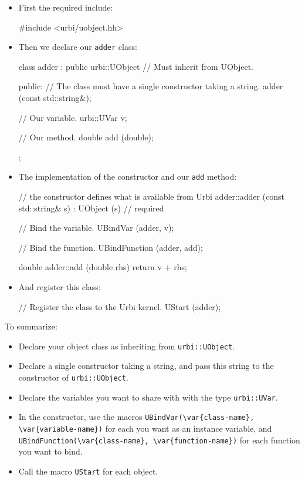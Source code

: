 \begin{itemize}
\item First the required include:

\begin{cxx}
#include <urbi/uobject.hh>
\end{cxx}

\item Then we declare our \lstinline{adder} class:
\begin{cxx}
class adder : public urbi::UObject // Must inherit from UObject.
{
  public:
   // The class must have a single constructor taking a string.
   adder (const std::string&);

   // Our variable.
   urbi::UVar v;

   // Our method.
   double add (double);
};
\end{cxx}
\item The implementation of the constructor and our \lstinline{add}
  method:
\begin{cxx}
// the constructor defines what is available from Urbi
adder::adder (const std::string& s)
  : UObject (s) // required
{
  // Bind the variable.
  UBindVar (adder, v);

  // Bind the function.
  UBindFunction (adder, add);
}

double
adder::add (double rhs)
{
  return v + rhs;
}
\end{cxx}
\item And register this class:
\begin{cxx}
// Register the class to the Urbi kernel.
UStart (adder);
\end{cxx}
\end{itemize}

To summarize:

\begin{itemize}
\item Declare your object class as inheriting from
  \lstinline{urbi::UObject}.
\item Declare a single constructor taking a string, and pass this
  string to the constructor of \lstinline{urbi::UObject}.
\item Declare the variables you want to share with \urbi with the type
  \lstinline{urbi::UVar}.
\item In the constructor, use the macros
  \lstinline|UBindVar(\var{class-name}, \var{variable-name})|
  for each \UVar you want as an instance variable, and
  \lstinline|UBindFunction(\var{class-name}, \var{function-name})| for
  each function you want to bind.
\item Call the macro \lstinline{UStart} for each object.
\end{itemize}

